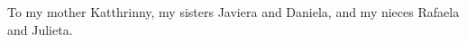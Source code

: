 \begin{dedication}
To my mother Katthrinny, my sisters Javiera and Daniela, and my nieces Rafaela and Julieta.
\end{dedication}